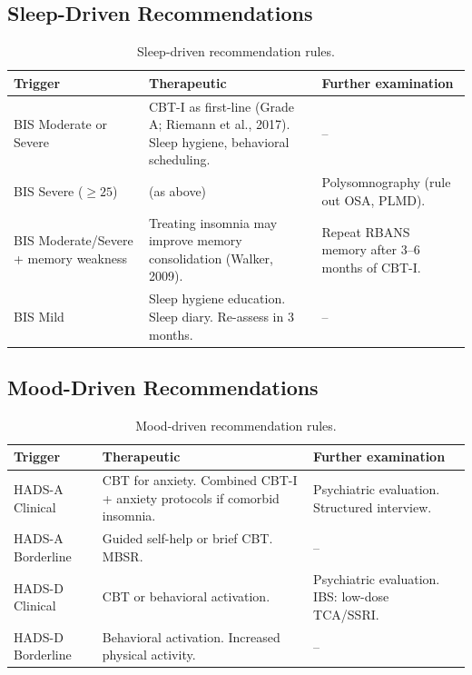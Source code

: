 
\subsection{Sleep-Driven Recommendations}

\begin{table}[H]
\centering
\caption{Sleep-driven recommendation rules.}
\label{tab:rec-sleep}
\begin{tabular}{p{3.5cm}p{5.0cm}p{4.5cm}}
\toprule
\textbf{Trigger} & \textbf{Therapeutic} & \textbf{Further examination} \\
\midrule
BIS Moderate or Severe & CBT-I as first-line (Grade A; Riemann et al., 2017). Sleep hygiene, behavioral scheduling. & -- \\
\addlinespace
BIS Severe ($\geq 25$) & (as above) & Polysomnography (rule out OSA, PLMD). \\
\addlinespace
BIS Moderate/Severe + memory weakness & Treating insomnia may improve memory consolidation (Walker, 2009). & Repeat RBANS memory after 3--6 months of CBT-I. \\
\addlinespace
BIS Mild & Sleep hygiene education. Sleep diary. Re-assess in 3 months. & -- \\
\bottomrule
\end{tabular}
\end{table}

\subsection{Mood-Driven Recommendations}

\begin{table}[H]
\centering
\caption{Mood-driven recommendation rules.}
\label{tab:rec-mood}
\begin{tabular}{p{3.5cm}p{5.0cm}p{4.5cm}}
\toprule
\textbf{Trigger} & \textbf{Therapeutic} & \textbf{Further examination} \\
\midrule
HADS-A Clinical & CBT for anxiety. Combined CBT-I + anxiety protocols if comorbid insomnia. & Psychiatric evaluation. Structured interview. \\
\addlinespace
HADS-A Borderline & Guided self-help or brief CBT. MBSR. & -- \\
\addlinespace
HADS-D Clinical & CBT or behavioral activation. & Psychiatric evaluation. IBS: low-dose TCA/SSRI. \\
\addlinespace
HADS-D Borderline & Behavioral activation. Increased physical activity. & -- \\
\bottomrule
\end{tabular}
\end{table}

